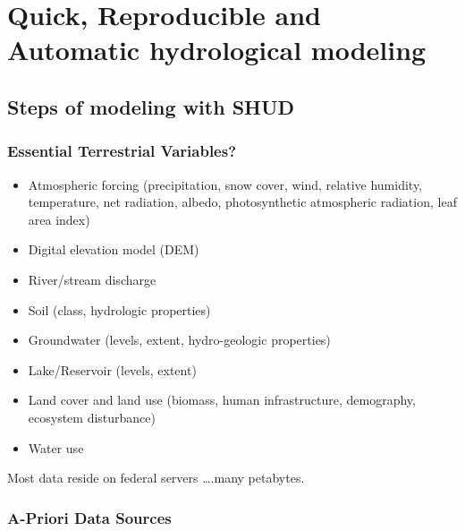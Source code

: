 \documentclass[
]{scrbook}
\providecommand{\tightlist}{%
  \setlength{\itemsep}{0pt}\setlength{\parskip}{0pt}}
\begin{document}
\hypertarget{quick-reproducible-and-automatic-hydrological-modeling}{%
\chapter{Quick, Reproducible and Automatic hydrological modeling}\label{quick-reproducible-and-automatic-hydrological-modeling}}

\hypertarget{steps-of-modeling-with-shud}{%
\section{Steps of modeling with SHUD}\label{steps-of-modeling-with-shud}}

\hypertarget{essential-terrestrial-variables}{%
\subsection{Essential Terrestrial Variables?}\label{essential-terrestrial-variables}}

\begin{itemize}
\tightlist
\item
  Atmospheric forcing (precipitation, snow cover, wind, relative humidity, temperature, net radiation, albedo, photosynthetic atmospheric radiation, leaf area index)
\item
  Digital elevation model (DEM)
\item
  River/stream discharge
\item
  Soil (class, hydrologic properties)
\item
  Groundwater (levels, extent, hydro-geologic properties)
\item
  Lake/Reservoir (levels, extent)
\item
  Land cover and land use (biomass, human infrastructure, demography, ecosystem disturbance)
\item
  Water use
\end{itemize}

Most data reside on federal servers \ldots.many petabytes.

\hypertarget{a-priori-data-sources}{%
\subsection{A-Priori Data Sources}\label{a-priori-data-sources}}
\end{document}
